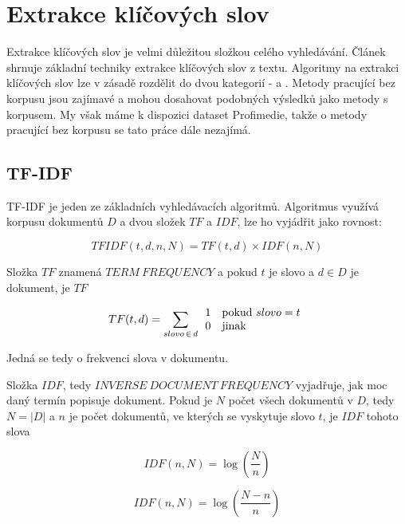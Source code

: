 \section{Extrakce klíčových slov}

Extrakce klíčových slov je velmi důležitou složkou celého vyhledávání. Článek \cite{lott} shrnuje základní techniky extrakce klíčových slov z textu. Algoritmy na extrakci klíčových slov lze v zásadě rozdělit do dvou kategorií -  a . Metody pracující bez korpusu jsou zajímavé a mohou dosahovat podobných výsledků jako metody s korpusem. My však máme k dispozici dataset Profimedie, takže o metody pracující bez korpusu se tato práce dále nezajímá. 

\subsection{TF-IDF}

TF-IDF je jeden ze základních vyhledávacích algoritmů. Algoritmus využívá korpusu dokumentů $D$ a dvou složek $TF$ a $IDF$, lze ho vyjádřit jako rovnost: 

\begin{equation}
  TFIDF(t,d,n,N)= TF(t,d)\times IDF(n,N)
\end{equation}

Složka $TF$ znamená $TERM\ FREQUENCY$ a pokud $t$ je slovo a $d \in D$ je dokument, je $TF$

\begin{equation}
 TF(t,d) = \sum_{slovo\,\in\,d} \begin{array}{l l} 1 & \mathrm{pokud}\ slovo = t \\
  0 & \mathrm{jinak} \end{array}
\end{equation}

Jedná se tedy o frekvenci slova v dokumentu.

Složka $IDF$, tedy $INVERSE\ DOCUMENT\ FREQUENCY$ vyjadřuje, jak moc daný termín popisuje dokument. Pokud je $N$ počet všech dokumentů v $D$, tedy $N = |D|$ a $n$ je počet dokumentů, ve kterých se vyskytuje slovo $t$, je $IDF$ tohoto slova

\begin{equation}
IDF(n,N) = \log \left(\frac{N}{n}\right)
\end{equation}

\begin{equation}
IDF(n,N) = \log \left(\frac{N - n}{n}\right)
\end{equation}

